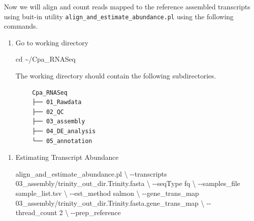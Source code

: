 \documentclass[
  letterpaper,
  DIV=11,
  numbers=noendperiod]{scrreprt}
\newenvironment{Shaded}{\begin{snugshade}}{\end{snugshade}}
\newcommand{\BuiltInTok}[1]{\textcolor[rgb]{0.00,0.23,0.31}{#1}}
\newcommand{\DataTypeTok}[1]{\textcolor[rgb]{0.68,0.00,0.00}{#1}}
\newcommand{\ExtensionTok}[1]{\textcolor[rgb]{0.00,0.23,0.31}{#1}}
\newcommand{\NormalTok}[1]{\textcolor[rgb]{0.00,0.23,0.31}{#1}}
\begin{document}
\begin{tcolorbox}[enhanced jigsaw, breakable, bottomrule=.15mm, left=2mm, coltitle=black, opacityback=0, colframe=quarto-callout-note-color-frame, toprule=.15mm, opacitybacktitle=0.6, colbacktitle=quarto-callout-note-color!10!white, bottomtitle=1mm, colback=white, toptitle=1mm, titlerule=0mm, rightrule=.15mm, arc=.35mm, title=\textcolor{quarto-callout-note-color}{\faInfo}\hspace{0.5em}{Activity}, leftrule=.75mm]

Now we will align and count reads mapped to the reference assembled
transcripts using buit-in utility
\texttt{align\_and\_estimate\_abundance.pl} using the following
commands.

\begin{enumerate}
\def\labelenumi{\arabic{enumi}.}
\item
  Go to working directory

\begin{Shaded}
\begin{Highlighting}[]
\BuiltInTok{cd}\NormalTok{ \textasciitilde{}/Cpa\_RNASeq}
\end{Highlighting}
\end{Shaded}

  The working directory should contain the following subdirectories.
\end{enumerate}

\begin{verbatim}
        Cpa_RNASeq
        ├── 01_Rawdata
        ├── 02_QC
        ├── 03_assembly
        ├── 04_DE_analysis
        └── 05_annotation
\end{verbatim}

\begin{enumerate}
\def\labelenumi{\arabic{enumi}.}
\setcounter{enumi}{1}
\item
  Estimating Transcript Abundance

\begin{Shaded}
\begin{Highlighting}[]
\ExtensionTok{align\_and\_estimate\_abundance.pl} \DataTypeTok{\textbackslash{}}
\NormalTok{{-}{-}transcripts 03\_assembly/trinity\_out\_dir.Trinity.fasta }\DataTypeTok{\textbackslash{}}
\NormalTok{{-}{-}seqType fq }\DataTypeTok{\textbackslash{}}
\NormalTok{{-}{-}samples\_file sample\_list.tsv }\DataTypeTok{\textbackslash{}}
\NormalTok{{-}{-}est\_method salmon }\DataTypeTok{\textbackslash{}}
\NormalTok{{-}{-}gene\_trans\_map 03\_assembly/trinity\_out\_dir.Trinity.fasta.gene\_trans\_map }\DataTypeTok{\textbackslash{}}
\NormalTok{{-}{-}thread\_count 2 }\DataTypeTok{\textbackslash{}}
\NormalTok{{-}{-}prep\_reference}
\end{Highlighting}
\end{Shaded}
\end{enumerate}

\end{tcolorbox}
\end{document}
